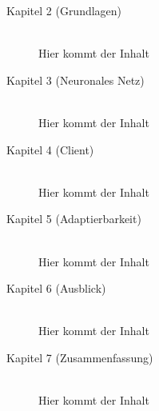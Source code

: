 \begin{description}

    \item[Kapitel 2 (Grundlagen)]\hfill \\
    Hier kommt der Inhalt

    \item[Kapitel 3 (Neuronales Netz)]\hfill \\
    Hier kommt der Inhalt

    \item[Kapitel 4 (Client)]\hfill \\
    Hier kommt der Inhalt

    \item[Kapitel 5 (Adaptierbarkeit)]\hfill \\
    Hier kommt der Inhalt

    \item[Kapitel 6 (Ausblick)]\hfill \\
    Hier kommt der Inhalt

    \item[Kapitel 7 (Zusammenfassung)]\hfill \\
    Hier kommt der Inhalt

\end{description}